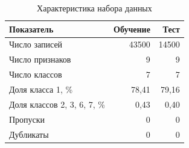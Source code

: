 \begin{table}[H]
\centering
\small
\caption{Характеристика набора данных}\label{tab:data}
\begin{tabular}{lrr}
\toprule
Показатель & Обучение & Тест \\
\midrule
Число записей & 43500 & 14500 \\
Число признаков & 9 & 9 \\
Число классов & 7 & 7 \\
Доля класса 1, \% & 78,41 & 79,16 \\
Доля классов 2, 3, 6, 7, \% & 0,43 & 0,40 \\
Пропуски & 0 & 0 \\
Дубликаты & 0 & 0 \\
\bottomrule
\end{tabular}
\end{table}